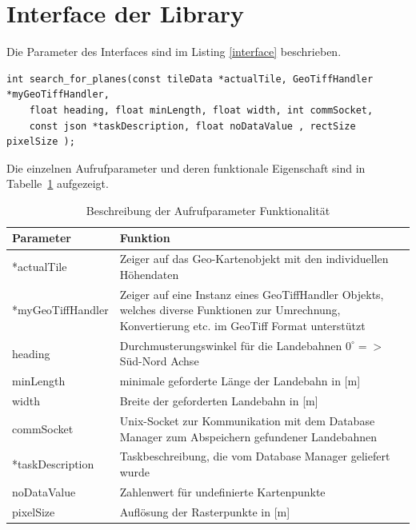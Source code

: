 \documentclass[10pt,a4paper]{report}
\begin{document}
\section{Interface der Library}

Die Parameter des Interfaces sind im Listing \ref{interface} beschrieben.

\begin{lstlisting}[language=myC, caption=Interface Beschreibung, label=interface]
int search_for_planes(const tileData *actualTile, GeoTiffHandler *myGeoTiffHandler, 
	float heading, float minLength, float width, int commSocket,
	const json *taskDescription, float noDataValue , rectSize pixelSize );
\end{lstlisting}

Die einzelnen Aufrufparameter und deren funktionale Eigenschaft sind in Tabelle~\ref{beschreibungparameter} aufgezeigt.

\begin{table}[htb]
\centering
\begin{tabular}{|p{4.5cm}|p{10cm}|}
\hline 
\bf{Parameter} & \bf{Funktion} \\ 
\hline 
*actualTile & Zeiger auf das Geo-Kartenobjekt mit den individuellen Höhendaten \\ 
\hline 
*myGeoTiffHandler & Zeiger auf eine Instanz eines GeoTiffHandler Objekts, 
welches diverse Funktionen zur Umrechnung, Konvertierung etc. im GeoTiff Format unterstützt \\ 
\hline 
heading & Durchmusterungswinkel für die Landebahnen $0^\circ =>$ Süd-Nord Achse \\ 
\hline 
minLength & minimale geforderte Länge der Landebahn in [m] \\ 
\hline 
width & Breite der geforderten Landebahn in [m] \\ 
\hline 
commSocket & Unix-Socket zur Kommunikation mit dem Database Manager zum Abspeichern gefundener Landebahnen\\ 
\hline 
*taskDescription & Taskbeschreibung, die vom Database Manager geliefert wurde\\ 
\hline 
noDataValue & Zahlenwert für undefinierte Kartenpunkte \\ 
\hline 
pixelSize & Auflösung der Rasterpunkte in [m]\\
\hline 

\end{tabular} 
\caption{Beschreibung der Aufrufparameter Funktionalität}\label{beschreibungparameter}
\end{table}
\end{document}
